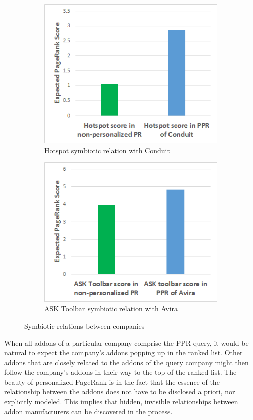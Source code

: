 \documentclass[11pt,oneside]{book}
\begin{document}
\begin{figure}[h]
\centering
\begin{subfigure}[b]{0.8\textwidth}
	\centering
\includegraphics[scale=0.8]{figures/hotspot_sym_conduit.png}
\caption{Hotspot symbiotic relation with Conduit}
\label{fig:hotspot_sym_conduit}
\end{subfigure}
\begin{subfigure}[b]{0.8\textwidth}
	\centering
\includegraphics[scale=0.8]{figures/ask_sym_avira.png}
\caption{ASK Toolbar symbiotic relation with Avira}
\label{fig:ask_sym_avira}
\end{subfigure}
\caption{Symbiotic relations between companies}
	\label{fig:symbiotic_2}
\end{figure}


When all addons of a particular company comprise the PPR query, it would be natural to expect the company's addons popping up in the ranked list. Other addons that are closely related to the addons of the query company might then follow the company's addons in their way to the top of the ranked list. The beauty of personalized PageRank is in the fact that the essence of the relationship between the addons does not have to be disclosed a priori, nor explicitly modeled. This implies that hidden, invisible relationships between addon manufacturers can be discovered in the process.
\end{document}
